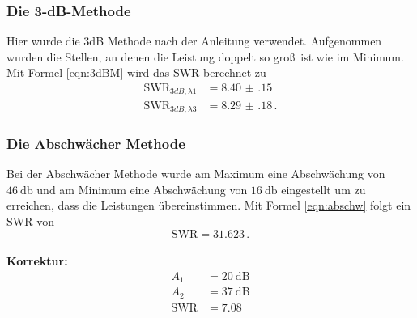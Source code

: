 \FloatBarrier

\subsubsection{Die 3-dB-Methode}
Hier wurde die 3dB Methode nach der Anleitung verwendet.
Aufgenommen wurden die Stellen, an denen die Leistung doppelt so groß\, ist wie
im Minimum. Mit Formel \eqref{eqn:3dBM} wird das SWR berechnet zu
\begin{align}
  \text{SWR}_{3dB, \lambda1} &= \num{8.40(15)} \\
  \text{SWR}_{3dB, \lambda3} &= \num{8.29(18)}\,.
\end{align}

\subsubsection{Die Abschwächer Methode}
Bei der Abschwächer Methode wurde am Maximum eine Abschwächung von
$\SI{46}{\decibel}$ und am Minimum eine Abschwächung von
$\SI{16}{\decibel}$ eingestellt um zu erreichen, dass die Leistungen
übereinstimmen.
Mit Formel \eqref{eqn:abschw} folgt ein SWR von
\begin{equation}
  \text{SWR} = \num{31.623}\,.
\end{equation} \\
\textbf{Korrektur:}
\begin{align}
  A_1 &= \SI{20}{\deci\bel} \\
  A_2 &= \SI{37}{\deci\bel} \\
  \text{SWR} &= \num{7.08}
\end{align}
